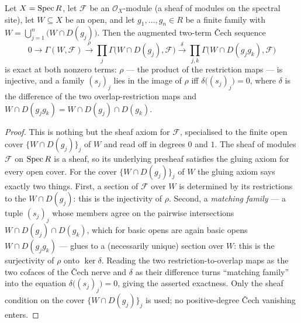 \begin{lemma}
  \label{lem:qcoh_section_equalizer}
  Let \(X = \operatorname{Spec} R\), let \(\mathcal{F}\) be an \(\mathcal{O}_X\)-module (a sheaf of modules on the
  spectral site), let \(W \subseteq X\) be an open, and let \(g_1, \ldots, g_n \in R\) be a finite family
  with \(W = \bigcup_{j=1}^{n} \bigl(W \cap D(g_j)\bigr)\). Then the augmented two-term {\v C}ech sequence
  \[
    0 \longrightarrow \Gamma(W, \mathcal{F})
      \xrightarrow{\ \rho\ } \prod_{j} \Gamma\bigl(W \cap D(g_j), \mathcal{F}\bigr)
      \xrightarrow{\ \delta\ } \prod_{j,k} \Gamma\bigl(W \cap D(g_j g_k), \mathcal{F}\bigr)
  \]
  is exact at both nonzero terms: \(\rho\) — the product of the restriction maps — is injective, and a
  family \((s_j)_j\) lies in the image of \(\rho\) iff \(\delta\bigl((s_j)_j\bigr) = 0\), where
  \(\delta\) is the difference of the two overlap-restriction maps and
  \(W \cap D(g_j g_k) = W \cap D(g_j) \cap D(g_k)\).
\end{lemma}
\begin{proof}

  This is nothing but the sheaf axiom for \(\mathcal{F}\), specialised to the finite open cover
  \(\{W \cap D(g_j)\}_{j}\) of \(W\) and read off in degrees \(0\) and \(1\). The sheaf of modules
  \(\mathcal{F}\) on \(\operatorname{Spec} R\) is a sheaf, so its underlying presheaf satisfies the gluing axiom for
  every open cover. For the cover \(\{W \cap D(g_j)\}_j\) of \(W\) the gluing axiom says exactly two
  things. First, a section of \(\mathcal{F}\) over \(W\) is determined by its restrictions to the
  \(W \cap D(g_j)\): this is the injectivity of \(\rho\). Second, a \emph{matching family} — a tuple
  \((s_j)_j\) whose members agree on the pairwise intersections
  \(W \cap D(g_j) \cap D(g_k)\), which for basic opens are again basic opens \(W \cap D(g_j g_k)\) —
  glues to a (necessarily unique) section over \(W\): this is the surjectivity of \(\rho\) onto
  \(\ker \delta\). Reading the two restriction-to-overlap maps as the two cofaces of the {\v C}ech nerve
  and \(\delta\) as their difference turns ``matching family'' into the equation
  \(\delta\bigl((s_j)_j\bigr) = 0\), giving the asserted exactness. Only the sheaf condition on the cover
  \(\{W \cap D(g_j)\}_j\) is used; no positive-degree {\v C}ech vanishing enters.
\end{proof}

